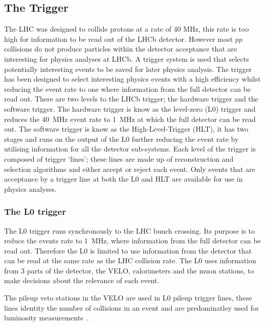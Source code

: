 \subsection{The Trigger}

\label{Trigger}

The LHC was designed to collide protons at a rate of 40 MHz, this rate is too high for information to be read out of the LHCb detector. However most $pp$ collisions do not produce particles within the detector acceptance that are interesting for physics analyses at LHCb. A trigger system is used that selects potentially interesting events to be saved for later physics analysis. The trigger has been designed to select interesting physics events with a high efficiency  whilst reducing the event rate to one where information from the full detector can be read out.  There are two levels to the LHCb trigger; the hardware trigger and the software trigger. The hardware trigger is know as the level-zero (L0) trigger and reduces the 40~MHz event rate to 1~MHz at which the full detector can be read out. The software trigger is know as the High-Level-Trigger (HLT), it has two stages and runs on the output of the L0 further reducing the event rate by utilising information for all the detector sub-systems. Each level of the trigger is composed of trigger `lines'; these lines are made up of reconstruction and selection algorithms and either accept or reject each event. Only events that are acceptance by a trigger line at both the L0 and HLT are available for use in physics analyses. 

\subsubsection{The L0 trigger}
\label{L0}


The L0 trigger runs synchronously to the LHC bunch crossing. Its purpose is to reduce the events rate to 1~MHz, where information from the full detector can be read out. Therefore the L0 is limited to use information from the detector that can be read at the same rate as the LHC collision rate.
The L0 uses information from 3 parts of the detector, the VELO, calorimeters and the muon stations, to make decisions about the relevance of each event.%


The pileup veto stations in the VELO are used in L0 pileup trigger lines, these lines identity the number of collisions in an event and are predominatley used for luminosity measurements~\cite{Aaij:2011er}.

